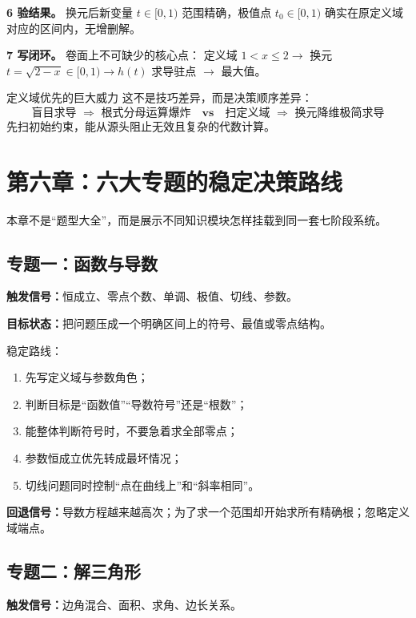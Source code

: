 \documentclass[11pt,a4paper]{ctexart}
\newcommand{\trigger}[1]{\textbf{触发信号：}#1}
\newcommand{\goal}[1]{\textbf{目标状态：}#1}
\newcommand{\rollback}[1]{\textbf{回退信号：}#1}
\begin{document}
\textbf{6 验结果。}
换元后新变量 $t \in [0, 1)$ 范围精确，极值点 $t_0 \in [0, 1)$ 确实在原定义域对应的区间内，无增删解。

\textbf{7 写闭环。}
卷面上不可缺少的核心点：
定义域 $1 < x \le 2 \rightarrow$ 换元 $t = \sqrt{2-x} \in [0,1) \rightarrow h(t)$ 求导驻点 $\rightarrow$ 最大值。

\begin{trainingbox}{定义域优先的巨大威力}
这不是技巧差异，而是决策顺序差异：
\[
\boxed{\text{盲目求导 }\Rightarrow\text{ 根式分母运算爆炸}\quad\mathbf{vs}\quad\text{扫定义域 }\Rightarrow\text{ 换元降维极简求导}}
\]
先扫初始约束，能从源头阻止无效且复杂的代数计算。
\end{trainingbox}

\section{第六章：六大专题的稳定决策路线}

本章不是“题型大全”，而是展示不同知识模块怎样挂载到同一套七阶段系统。

\subsection{专题一：函数与导数}

\trigger{恒成立、零点个数、单调、极值、切线、参数。}

\goal{把问题压成一个明确区间上的符号、最值或零点结构。}

稳定路线：
\begin{enumerate}
  \item 先写定义域与参数角色；
  \item 判断目标是“函数值”“导数符号”还是“根数”；
  \item 能整体判断符号时，不要急着求全部零点；
  \item 参数恒成立优先转成最坏情况；
  \item 切线问题同时控制“点在曲线上”和“斜率相同”。
\end{enumerate}

\rollback{导数方程越来越高次；为了求一个范围却开始求所有精确根；忽略定义域端点。}

\subsection{专题二：解三角形}

\trigger{边角混合、面积、求角、边长关系。}
\end{document}
